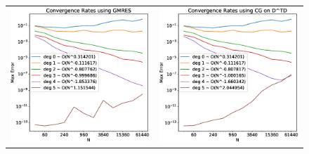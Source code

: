 \documentclass[12pt]{article}
\begin{document}
\begin{figure}[hp]
\begin{tabular}{cc}
			\includegraphics[width=\convFigSize\textwidth]{Convergence_GMRES.eps} & \includegraphics[width=\convFigSize\textwidth]{Convergence_Transpose.eps} \\

\end{tabular}
\end{figure}
\end{document}
